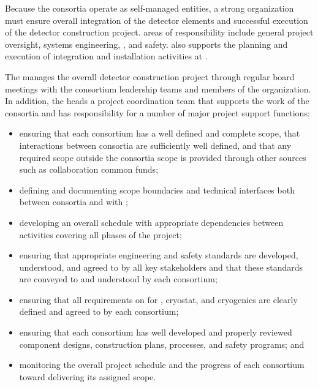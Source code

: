 Because the consortia operate as self-managed entities, a strong
 organization must ensure overall integration 
of the detector elements and successful execution of the detector
construction project.   areas of responsibility include 
general project oversight, systems engineering, , and 
safety.   also supports the planning and execution 
of integration and installation activities at .  

The  manages the overall detector construction project
through regular board meetings with the consortium leadership teams 
and members of the  organization.  
%
In addition, the  heads %
a project coordination team that supports the work of 
the consortia and has responsibility for a number of major project 
support functions: 
\begin{itemize}
\item ensuring that each consortium has a well defined and complete
  scope, that interactions between consortia are sufficiently 
  well defined, and that any required scope outside the 
  consortia scope is provided through other sources such as collaboration
  common funds;
\item defining and documenting scope boundaries and technical 
  interfaces both between consortia and with ;  
\item developing an overall schedule with appropriate dependencies
  between activities covering all phases of the project;  
\item ensuring that appropriate engineering and safety standards 
  are developed, understood, and agreed to by all key stakeholders 
  and that these standards are conveyed to and understood by each
  consortium;
\item ensuring that all  requirements on  
  for , cryostat, and cryogenics are clearly defined and 
  agreed to by each consortium;
\item ensuring that each consortium has well developed and properly reviewed
  component designs, construction plans,  processes, and 
  safety programs; and
\item monitoring the overall project schedule and the progress of 
  each consortium toward delivering its assigned scope. 
\end{itemize}

